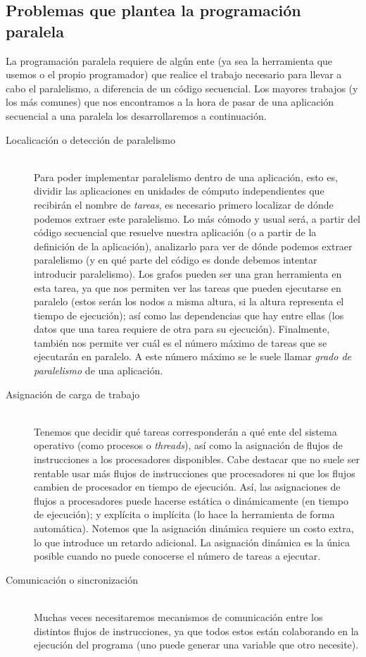 \subsection{Problemas que plantea la programación paralela}
La programación paralela requiere de algún ente (ya sea la herramienta que usemos o el propio programador) que realice el trabajo necesario para llevar a cabo el paralelismo, a diferencia de un código secuencial. Los mayores trabajos (y los más comunes) que nos encontramos a la hora de pasar de una aplicación secuencial a una paralela los desarrollaremos a continuación.

\begin{description}
    \item [Localicación o detección de paralelismo]~\\
        Para poder implementar paralelismo dentro de una aplicación, esto es, dividir las aplicaciones en unidades de cómputo independientes que recibirán el nombre de \emph{tareas}, es necesario primero localizar de dónde podemos extraer este paralelismo. Lo más cómodo y usual será, a partir del código secuencial que resuelve nuestra aplicación (o a partir de la definición de la aplicación), analizarlo para ver de dónde podemos extraer paralelismo (y en qué parte del código es donde debemos intentar introducir paralelismo). Los grafos pueden ser una gran herramienta en esta tarea, ya que nos permiten ver las tareas que pueden ejecutarse en paralelo (estos serán los nodos a misma altura, si la altura representa el tiempo de ejecución); así como las dependencias que hay entre ellas (los datos que una tarea requiere de otra para su ejecución). Finalmente, también nos permite ver cuál es el número máximo de tareas que se ejecutarán en paralelo. A este número máximo se le suele llamar \emph{grado de paralelismo} de una aplicación.
    \item [Asignación de carga de trabajo]~\\
        Tenemos que decidir qué tareas corresponderán a qué ente del sistema operativo (como procesos o \emph{threads}), así como la asignación de flujos de instrucciones a los procesadores disponibles. Cabe destacar que no suele ser rentable usar más flujos de instrucciones que procesadores ni que los flujos cambien de procesador en tiempo de ejecución. Así, las asignaciones de flujos a procesadores puede hacerse estática o dinámicamente (en tiempo de ejecución); y explícita o implícita (lo hace la herramienta de forma automática). Notemos que la asignación dinámica requiere un costo extra, lo que introduce un retardo adicional. La asignación dinámica es la única posible cuando no puede conocerse el número de tareas a ejecutar. 
    \item [Comunicación o sincronización]~\\
        Muchas veces necesitaremos mecanismos de comunicación entre los distintos flujos de instrucciones, ya que todos estos están colaborando en la ejecución del programa (uno puede generar una variable que otro necesite). 
\end{description}

